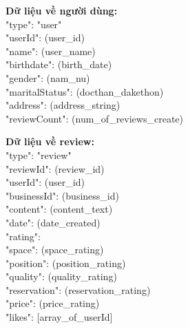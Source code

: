 \documentclass[12pt]{extarticle}
\begin{document}
			\par \textbf{Dữ liệu về người dùng:}\\
				{\selectfont
				"type": "user"\\
				"userId": (user\_id)\\
				"name": (user\_name)\\
				"birthdate": (birth\_date)\\
				"gender": (nam\_nu)\\
				"maritalStatus": (docthan\_dakethon)\\
				"address": (address\_string)\\
				"reviewCount": (num\_of\_reviews\_create)
				}

			\par \textbf{Dữ liệu về review:}\\
				{\selectfont
				"type": "review"\\
				"reviewId": (review\_id)\\
				"userId": (user\_id)\\
				"businessId": (business\_id)\\
				"content": (content\_text)\\
				"date": (date\_created)\\
				"rating":\\
				\hspace*{1.5cm}"space": (space\_rating)\\
				\hspace*{1.5cm}"position": (position\_rating)\\
				\hspace*{1.5cm}"quality": (quality\_rating)\\
				\hspace*{1.5cm}"reservation": (reservation\_rating)\\
				\hspace*{1.5cm}"price": (price\_rating)\\		
				"likes": [array\_of\_userId]
				}
					
\end{document}
